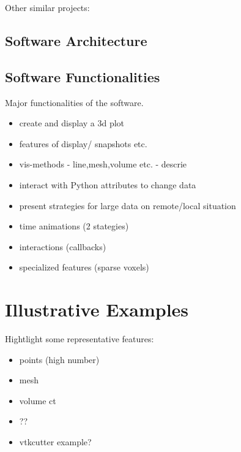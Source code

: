 \documentclass[preprint,12pt, a4paper]{elsarticle}
\begin{document}
Other similar projects: \cite{10.1145/3093338.3104159}






\subsection{Software Architecture}
\label{}


\subsection{Software Functionalities}
\label{}

Major functionalities of the software.

\begin{itemize}
\item create and display a 3d plot
\item features of display/ snapshots etc.
\item vis-methods - line,mesh,volume etc. - descrie
\item interact with Python attributes to change data
\item present strategies for large data on remote/local situation
\item time animations (2 stategies)
\item interactions (callbacks)
\item specialized features (sparse voxels)

\end{itemize}

\section{Illustrative Examples}
\label{}

Hightlight some representative features:
\begin{itemize}
\item points (high number)
\item mesh 
\item  volume ct
\item  ?? 
\item vtkcutter example?
\end{itemize}
\end{document}
